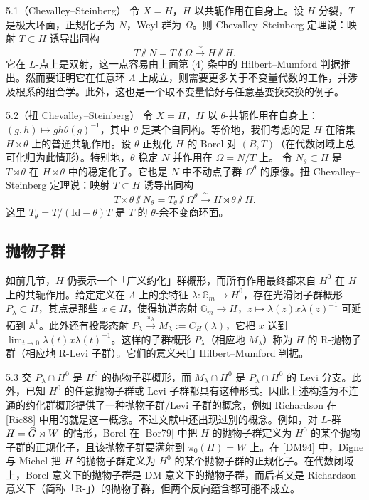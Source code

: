 \begin{exam}{5.1（Chevalley--Steinberg）}
令 $X=H$，$H$ 以共轭作用在自身上。设 $H$ 分裂，$T$ 是极大环面，正规化子为 $N$，Weyl 群为 $\Omega$。则 Chevalley--Steinberg 定理说：映射 $T\subset H$ 诱导出同构
\[
T\sslash N=T\sslash\Omega\xrightarrow{\ \sim\ }H\sslash H.
\]
它在 $L$-点上是双射，这一点容易由上面第 (4) 条中的 Hilbert--Mumford 判据推出。然而要证明它在任意环 $\Lambda$ 上成立，则需要更多关于不变量代数的工作，并涉及根系的组合学。此外，这也是一个取不变量恰好与任意基变换交换的例子。
\end{exam}

\begin{exam}{5.2（扭 Chevalley--Steinberg）}
令 $X=H$，$H$ 以 $\theta$-共轭作用在自身上：$(g,h)\mapsto gh\theta(g)^{-1}$，其中 $\theta$ 是某个自同构。等价地，我们考虑的是 $H$ 在陪集 $H\rtimes\theta$ 上的普通共轭作用。设 $\theta$ 正规化 $H$ 的 Borel 对 $(B,T)$（在代数闭域上总可化归为此情形）。特别地，$\theta$ 稳定 $N$ 并作用在 $\Omega=N/T$ 上。
令 $N_\theta\subset H$ 是 $T\rtimes\theta$ 在 $H\rtimes\theta$ 中的稳定化子。它也是 $N$ 中不动点子群 $\Omega^\theta$ 的原像。扭 Chevalley--Steinberg 定理说：映射 $T\subset H$ 诱导出同构
\[
T\rtimes\theta\sslash N_\theta=T_\theta\sslash\Omega^\theta\xrightarrow{\ \sim\ }H\rtimes\theta\sslash H.
\]
这里 $T_\theta=T/(\mathrm{Id}-\theta)T$ 是 $T$ 的 $\theta$-余不变商环面。
\end{exam}

\subsection{抛物子群}
如前几节，$H$ 仍表示一个「广义约化」群概形，而所有作用最终都来自 $H^0$ 在 $H$ 上的共轭作用。给定定义在 $\Lambda$ 上的余特征 $\lambda:\mathbb G_m\to H^0$，存在光滑闭子群概形 $P_\lambda\subset H$，其点是那些 $x\in H$，使得轨道态射 $\mathbb G_m\to H$，$z\mapsto\lambda(z)x\lambda(z)^{-1}$ 可延拓到 $\mathbb A^1$。此外还有投影态射 $P_\lambda\xrightarrow{\pi_\lambda}M_\lambda:=C_H(\lambda)$，它把 $x$ 送到 $\lim_{t\to0}\lambda(t)x\lambda(t)^{-1}$。这样的子群概形 $P_\lambda$（相应地 $M_\lambda$）称为 $H$ 的 R-抛物子群（相应地 R-Levi 子群）。它们的意义来自 Hilbert--Mumford 判据。

\begin{rem}{5.3}
交 $P_\lambda\cap H^0$ 是 $H^0$ 的抛物子群概形，而 $M_\lambda\cap H^0$ 是 $P_\lambda\cap H^0$ 的 Levi 分支。此外，已知 $H^0$ 的任意抛物子群或 Levi 子群都具有这种形式。因此上述构造为不连通的约化群概形提供了一种抛物子群/Levi 子群的概念，例如 Richardson 在 [Ric88] 中用的就是这一概念。不过文献中还出现过别的概念。例如，对 $L$-群 $H=\widehat{G}\rtimes W$ 的情形，Borel 在 [Bor79] 中把 $H$ 的抛物子群定义为 $H^0$ 的某个抛物子群的正规化子，且该抛物子群要满射到 $\pi_0(H)=W$ 上。在 [DM94] 中，Digne 与 Michel 把 $H$ 的抛物子群定义为 $H^0$ 的某个抛物子群的正规化子。在代数闭域上，Borel 意义下的抛物子群是 DM 意义下的抛物子群，而后者又是 Richardson 意义下（简称「R-」）的抛物子群，但两个反向蕴含都可能不成立。
\end{rem}

